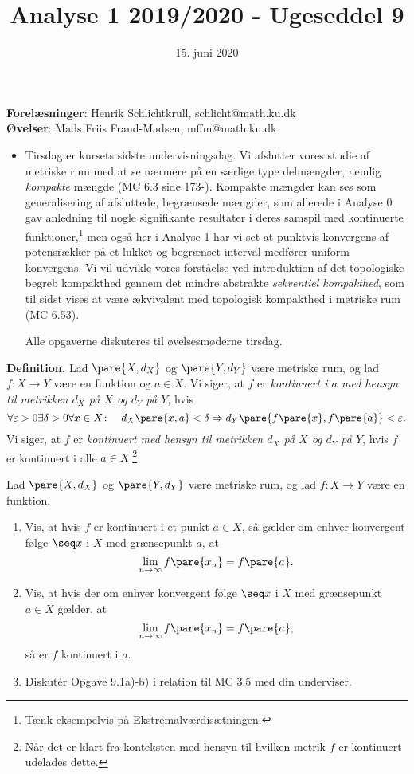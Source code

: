 \documentclass{article}
\title{Analyse 1 2019/2020 - Ugeseddel 9}
\author{}
\date{\vspace{-1cm}15. juni 2020}
\begin{document}
\maketitle

\noindent
\textbf{Forelæsninger}: Henrik Schlichtkrull, schlicht@math.ku.dk \\
\textbf{Øvelser}: Mads Friis Frand-Madsen, mffm@math.ku.dk

\setcounter{section}{9}

\begin{itemize}
    \item Tirsdag er kursets sidste undervisningsdag. Vi afslutter vores studie af metriske rum med at se nærmere på en særlige type delmængder, nemlig \textit{kompakte} mængde (MC 6.3 side 173-). Kompakte mængder kan ses som generalisering af afsluttede, begrænsede mængder, som allerede i Analyse 0 gav anledning til nogle signifikante resultater i deres samspil med kontinuerte funktioner,\footnote{Tænk eksempelvis på Ekstremalværdisætningen.} men også her i Analyse 1 har vi set at punktvis konvergens af potensrækker på et lukket og begrænset interval medfører uniform konvergens. Vi vil udvikle vores forståelse ved introduktion af det topologiske begreb kompakthed gennem det mindre abstrakte \textit{sekventiel kompakthed}, som til sidst vises at være ækvivalent med topologisk kompakthed i metriske rum (MC 6.53).
    
    Alle opgaverne diskuteres til øvelsesmøderne tirsdag.
\end{itemize}

\noindent
\textbf{Definition.} Lad $\pare{X,d_X}$ og $\pare{Y,d_Y}$ være metriske rum, og lad $f\colon X\to Y$ være en funktion og $a\in X$.  Vi siger, at $f$ er \textit{kontinuert i $a$ med hensyn til metrikken $d_X$ på $X$ og $d_Y$ på $Y$}, hvis
$$ \forall\varepsilon>0\exists \delta>0\forall x\in X\colon\quad d_X\pare{x,a} < \delta \Rightarrow d_Y\pare{f\pare{x},f\pare{a}} < \varepsilon. $$
Vi siger, at $f$ er \textit{kontinuert med hensyn til metrikken $d_X$ på $X$ og $d_Y$ på $Y$}, hvis $f$ er kontinuert i alle $a\in X$.\footnote{Når det er klart fra konteksten med hensyn til hvilken metrik $f$ er kontinuert udelades dette.}

\begin{opg}
Lad $\pare{X,d_X}$ og $\pare{Y,d_Y}$ være metriske rum, og lad $f\colon X\to Y$ være en funktion.

\begin{enumerate}
    \item Vis, at hvis $f$ er kontinuert i et punkt $a\in X$, så gælder om enhver konvergent følge $\seq x$ i $X$ med grænsepunkt $a$, at
    $$ \lim_{n\to\infty} f\pare{x_n} = f\pare{a}. $$
    
    \item Vis, at hvis der om enhver konvergent følge $\seq x$ i $X$ med grænsepunkt $a\in X$ gælder, at
    $$ \lim_{n\to\infty} f\pare{x_n} = f\pare{a}, $$
    så er $f$ kontinuert i $a$.
    
    \item Diskutér Opgave 9.1a)-b) i relation til MC 3.5 med din underviser.
\end{enumerate}
\end{opg}
\end{document}
